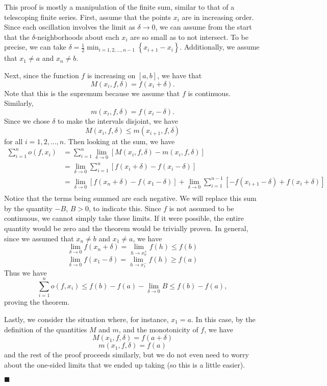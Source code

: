 \documentclass[12pt]{article}
\renewcommand{\qed}{\hfill$\blacksquare$}
\renewenvironment{proof}{\begin{addmargin}[1em]{0em}\begin{newproof}}{\end{newproof}\end{addmargin}\qed}
\begin{document}
\begin{proof}
This proof is mostly a manipulation of the finite sum, similar to that of a telescoping finite series. First, assume that the points $x_i$ are in increasing order. Since each oscillation involves the limit as $\delta \rightarrow 0$, we can assume from the start that the $\delta$-neighborhoods about each $x_i$ are so small as to not intersect. To be precise, we can take $\delta = \frac{1}{2}\min_{i=1,2,\ldots,n-1} \left\{ x_{i+1}-x_i \right\}$. Additionally, we assume that $x_1 \neq a$ and $x_n \neq b$.

Next, since the function $f$ is increasing on $\left[a,b\right]$, we have that $$ M\left(x_i, f, \delta\right) = f\left(x_i + \delta\right).$$ Note that this is the supremum because we assume that $f$ is continuous. Similarly, $$ m\left(x_i,f,\delta\right) = f\left(x_i - \delta\right).$$ Since we chose $\delta$ to make the intervals disjoint, we have $$ M\left(x_i, f,\delta\right) \leq m\left(x_{i+1},f,\delta\right)$$ for all $i=1,2,\ldots, n$. Then looking at the sum, we have 
\begin{align*}
\sum_{i=1}^n o\left(f,x_i\right) & = \sum_{i=1}^n \lim_{\delta\rightarrow 0} \left[ M\left(x_i,f,\delta\right) - m\left(x_i,f,\delta\right)\right] \\ 
& = \lim_{\delta\rightarrow 0} \sum_{i=1}^n \left[ f\left(x_i + \delta\right) - f\left(x_i - \delta\right)\right] \\
& = \lim_{\delta\rightarrow 0} \left[ f\left(x_n + \delta\right) - f\left(x_1 - \delta\right) \right] + \lim_{\delta\rightarrow 0} \sum_{i=1}^{n-1} \left[ -f\left(x_{i+1} - \delta\right) + f\left(x_i + \delta\right)\right] \\
\end{align*}
Notice that the terms being summed are each negative. We will replace this sum by the quantity $-B$, $B>0$, to indicate this. Since $f$ is not assumed to be continuous, we cannot simply take these limits. If it were possible, the entire quantity would be zero and the theorem would be trivially proven. In general, since we assumed that $x_n \neq b$ and $x_1 \neq a$, we have $$ \lim_{\delta\rightarrow 0} f\left(x_n+\delta\right) = \lim_{h\rightarrow x_n^+} f\left(h\right) \leq f\left(b\right) $$ 
$$ \lim_{\delta\rightarrow 0} f\left(x_1-\delta\right) = \lim_{h\rightarrow x_1^-} f\left(h\right) \geq f\left(a\right)  $$
Thus we have 
$$ \sum_{i=1}^n o\left(f,x_i\right) \leq f\left(b\right) - f\left(a\right) - \lim_{\delta \rightarrow 0} B \leq f\left(b\right) - f\left(a\right), $$ proving the theorem. 

Lastly, we consider the situation where, for instance, $x_1 = a$. In this case, by the definition of the quantities $M$ and $m$, and the monotonicity of $f$, we have $$ M\left(x_1, f,\delta\right) = f\left(a+\delta\right)$$ $$ m\left(x_1,f,\delta\right) = f\left(a\right) $$ and the rest of the proof proceeds similarly, but we do not even need to worry about the one-sided limits that we ended up taking (so this is a little easier).

\end{proof} 
 
\end{document}

